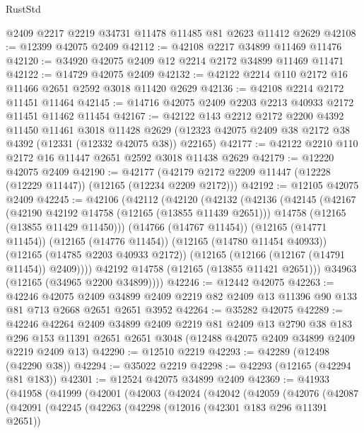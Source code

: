 \begin{lexlean}{RustStd}
\begin{coremodule}
    @2409
    @2217
    @2219
    @34731
    @11478
    @11485
    @81
    @2623
    @11412
    @2629
@42108 := @12399 @42075 @2409
@42112 := @42108 @2217 @34899 @11469 @11476
@42120 := @34920 @42075 @2409 @12 @2214 @2172 @34899 @11469 @11471
@42122 := @14729 @42075 @2409
@42132 := @42122 @2214 @110 @2172 @16 @11466 @2651 @2592 @3018 @11420 @2629
@42136 := @42108 @2214 @2172 @11451 @11464
@42145 := @14716 @42075 @2409 @2203 @2213 @40933 @2172 @11451 @11462 @11454
@42167 := @42122
    @143
    @2212
    @2172
    @2200
    @4392
    @11450
    @11461
    @3018
    @11428
    @2629
    (@12323 @42075 @2409 @38 @2172 @38 @4392 (@12331 (@12332 @42075 @38)) @22165)
@42177 := @42122 @2210 @110 @2172 @16 @11447 @2651 @2592 @3018 @11438 @2629
@42179 := @12220 @42075 @2409
@42190 := @42177 (@42179 @2172 @2209 @11447 (@12228 (@12229 @11447)) (@12165 (@12234 @2209 @2172)))
@42192 := @12105 @42075 @2409
@42245 := @42106
    (@42112
      (@42120
        (@42132
          (@42136
            (@42145
              (@42167
                (@42190 @42192 @14758 (@12165 (@13855 @11439 @2651)))
                @14758
                (@12165 (@13855 @11429 @11450)))
              (@14766 (@14767 @11454))
              (@12165 (@14771 @11454))
              (@12165 (@14776 @11454))
              (@12165 (@14780 @11454 @40933))
              (@12165 (@14785 @2203 @40933 @2172))
              (@12165 (@12166 (@12167 (@14791 @11454)) @2409))))
          @42192
          @14758
          (@12165 (@13855 @11421 @2651)))
        @34963
        (@12165 (@34965 @2200 @34899))))
@42246 := @12442 @42075
@42263 := @42246
    @42075
    @2409
    @34899
    @2409
    @2219
    @82
    @2409
    @13
    @11396
    @90
    @133
    @81
    @713
    @2668
    @2651
    @2651
    @3952
@42264 := @35282 @42075
@42289 := @42246
    @42264
    @2409
    @34899
    @2409
    @2219
    @81
    @2409
    @13
    @2790
    @38
    @183
    @296
    @153
    @11391
    @2651
    @2651
    @3048
    (@12488 @42075 @2409 @34899 @2409 @2219 @2409 @13)
@42290 := @12510 @2219
@42293 := @42289 (@12498 (@42290 @38))
@42294 := @35022 @2219
@42298 := @42293 (@12165 (@42294 @81 @183))
@42301 := @12524 @42075 @34899 @2409
@42369 := @41933
    (@41958
      (@41999
        (@42001
          (@42003
            (@42024
              (@42042
                (@42059
                  (@42076
                    (@42087
                      (@42091
                        (@42245
                          (@42263
                            (@42298
                              (@12016 (@42301 @183 @296 @11391 @2651))

\end{coremodule}
\end{lexlean}
